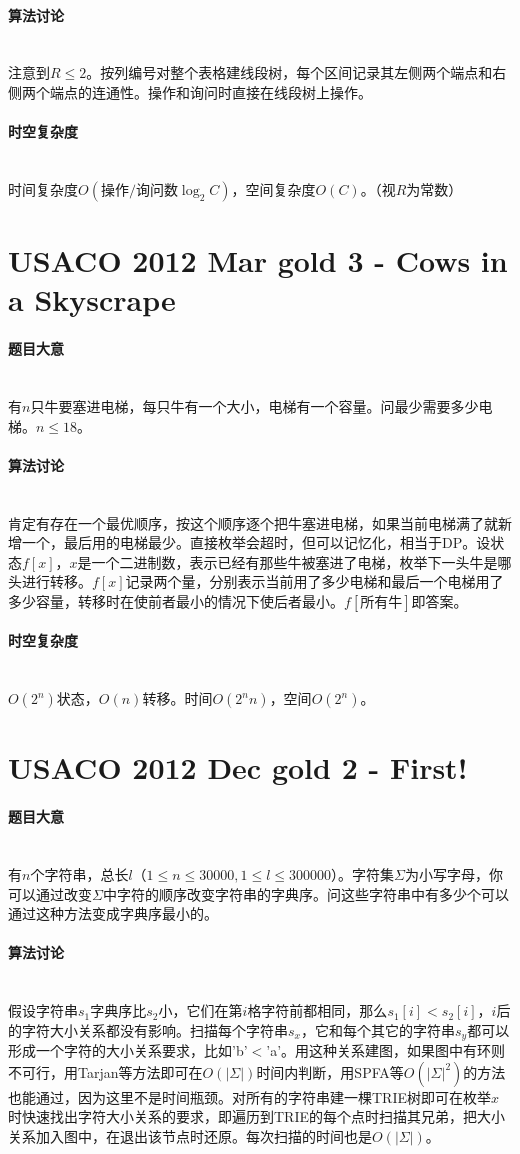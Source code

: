 \documentclass[UTF8]{ctexart}
\newcommand{\myparagraph}[1]{\paragraph{#1}\mbox{}\\}
\theoremstyle{nonumberplain}
\begin{document}
		\myparagraph{算法讨论}
		
			注意到$R \leq 2$。按列编号对整个表格建线段树，每个区间记录其左侧两个端点和右侧两个端点的连通性。操作和询问时直接在线段树上操作。
		
		\myparagraph{时空复杂度}
		
			时间复杂度$O(\mbox{操作/询问数}\log_2C)$，空间复杂度$O(C)$。（视$R$为常数）
	
	\section{USACO 2012 Mar gold 3 - Cows in a Skyscrape}
	
		\myparagraph{题目大意}
		
			有$n$只牛要塞进电梯，每只牛有一个大小，电梯有一个容量。问最少需要多少电梯。$n \leq 18$。
			
		\myparagraph{算法讨论}
		
			肯定有存在一个最优顺序，按这个顺序逐个把牛塞进电梯，如果当前电梯满了就新增一个，最后用的电梯最少。直接枚举会超时，但可以记忆化，相当于DP。设状态$f[x]$，$x$是一个二进制数，表示已经有那些牛被塞进了电梯，枚举下一头牛是哪头进行转移。$f[x]$记录两个量，分别表示当前用了多少电梯和最后一个电梯用了多少容量，转移时在使前者最小的情况下使后者最小。$f[\mbox{所有牛}]$即答案。
			
		\myparagraph{时空复杂度}
		
			$O(2^n)$状态，$O(n)$转移。时间$O(2^nn)$，空间$O(2^n)$。
	
	\section{USACO 2012 Dec gold 2 - First!}
		
		\myparagraph{题目大意}
		
			有$n$个字符串，总长$l$（$1 \leq n \leq 30000, 1 \leq l \leq 300000$）。字符集$\Sigma$为小写字母，你可以通过改变$\Sigma$中字符的顺序改变字符串的字典序。问这些字符串中有多少个可以通过这种方法变成字典序最小的。
		
		\myparagraph{算法讨论}
		
			假设字符串$s_1$字典序比$s_2$小，它们在第$i$格字符前都相同，那么$s_1[i]<s_2[i]$，$i$后的字符大小关系都没有影响。扫描每个字符串$s_x$，它和每个其它的字符串$s_y$都可以形成一个字符的大小关系要求，比如'b'$<$'a'。用这种关系建图，如果图中有环则不可行，用Tarjan等方法即可在$O(|\Sigma|)$时间内判断，用SPFA等$O(|\Sigma|^2)$的方法也能通过，因为这里不是时间瓶颈。对所有的字符串建一棵TRIE树即可在枚举$x$时快速找出字符大小关系的要求，即遍历到TRIE的每个点时扫描其兄弟，把大小关系加入图中，在退出该节点时还原。每次扫描的时间也是$O(|\Sigma|)$。
		
\end{document}

